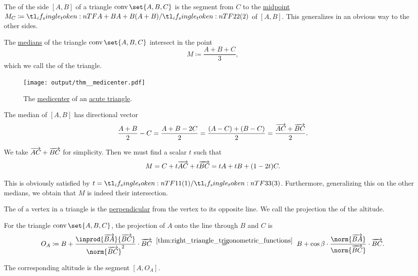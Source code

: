 \begin{definition}\label{def:triangle_median}\mimprovised
  The  of the side \( [A, B] \) of a triangle \( \conv\set{ A, B, C } \) is the segment from \( C \) to the \hyperref[thm:segment_midpoint]{midpoint} \( M_C \coloneqq \ifrac {A + B} 2 \) of \( [A, B] \). This generalizes in an obvious way to the other sides.
\end{definition}

\begin{proposition}\label{thm:medicenter}
  The \hyperref[def:triangle_median]{medians} of the triangle \( \conv\set{ A, B, C } \) intersect in the point
  \begin{equation*}
    M \coloneqq \frac {A + B + C} 3,
  \end{equation*}
  which we call the  of the triangle.

  \begin{figure}[!ht]
    \centering
    \texttt{[image: output/thm\_\_medicenter.pdf]}
    \caption{The \hyperref[thm:medicenter]{medicenter} of an \hyperref[def:triangle/measure/acute]{acute triangle}.}\label{fig:thm:medicenter}
  \end{figure}
\end{proposition}
\begin{defproof}
  The median of \( [A, B] \) has directional vector
  \begin{equation*}
    \frac {A + B} 2 - C
    =
    \frac {A + B - 2C} 2
    =
    \frac {(A - C) + (B - C)} 2
    =
    \frac {\overrightarrow{AC} + \overrightarrow{BC}} 2.
  \end{equation*}

  We take \( \overrightarrow{AC} + \overrightarrow{BC} \) for simplicity. Then we must find a scalar \( t \) such that
  \begin{equation*}
    M = C + t \overrightarrow{AC} + t \overrightarrow{BC} = t A + t B + (1 - 2t) C.
  \end{equation*}

  This is obviously satisfied by \( t = \ifrac 1 3 \). Furthermore, generalizing this on the other medians, we obtain that \( M \) is indeed their intersection.
\end{defproof}

\begin{definition}\label{def:triangle_altitude}
  The  of a vertex in a triangle is the \hyperref[def:perpendicularity]{perpendicular} from the vertex to its opposite line. We call the projection the  of the altitude.

  For the triangle \( \conv\set{ A, B, C } \), the projection of \( A \) onto the line through \( B \) and \( C \) is
  \begin{equation*}
    O_A
    \coloneqq
    B + \frac {\inprod {\vect{BA}} {\vect{BC}}} {\norm{\vect{BC}}^2} \cdot \vect{BC}
    \reloset {\ref{thm:right_triangle_trigonometric_functions}} =
    B + \cos \beta \cdot \frac {\norm{\vect{BA}}} {\norm{\vect{BC}}} \cdot \vect{BC}.
  \end{equation*}

  The corresponding altitude is the segment \( [A, O_A] \).
\end{definition}


